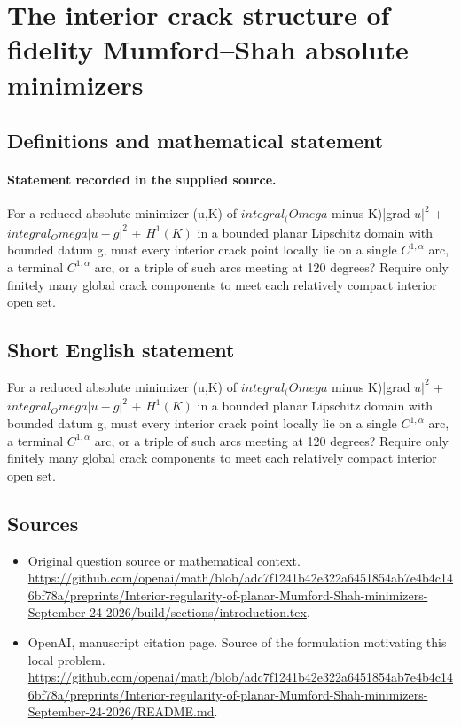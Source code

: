 \documentclass[11pt]{article}
\begin{document}
\section*{The interior crack structure of fidelity Mumford–Shah absolute minimizers}\label{statement}
\subsection{Definitions and mathematical statement}
\paragraph{Statement recorded in the supplied source.}
For a reduced absolute minimizer (u,K) of $integral_(Omega$ minus K)|grad $u|^2$ + $integral_Omega|u-g|^2$ + $H^1(K)$ in a bounded planar Lipschitz domain with bounded datum g, must every interior crack point locally lie on a single $C^{1,\alpha }$ arc, a terminal $C^{1,\alpha }$ arc, or a triple of such arcs meeting at 120 degrees? Require only finitely many global crack components to meet each relatively compact interior open set.
\subsection{Short English statement}
For a reduced absolute minimizer (u,K) of $integral_(Omega$ minus K)|grad $u|^2$ + $integral_Omega|u-g|^2$ + $H^1(K)$ in a bounded planar Lipschitz domain with bounded datum g, must every interior crack point locally lie on a single $C^{1,\alpha }$ arc, a terminal $C^{1,\alpha }$ arc, or a triple of such arcs meeting at 120 degrees? Require only finitely many global crack components to meet each relatively compact interior open set.
\subsection{Sources}
\begin{itemize}
\item[S1] Original question source or mathematical context.
\url{https://github.com/openai/math/blob/adc7f1241b42e322a6451854ab7e4b4c146bf78a/preprints/Interior-regularity-of-planar-Mumford-Shah-minimizers-September-24-2026/build/sections/introduction.tex}.
\item[S2] OpenAI, manuscript citation page. Source of the formulation motivating this local problem.
\url{https://github.com/openai/math/blob/adc7f1241b42e322a6451854ab7e4b4c146bf78a/preprints/Interior-regularity-of-planar-Mumford-Shah-minimizers-September-24-2026/README.md}.
\end{itemize}
\end{document}
